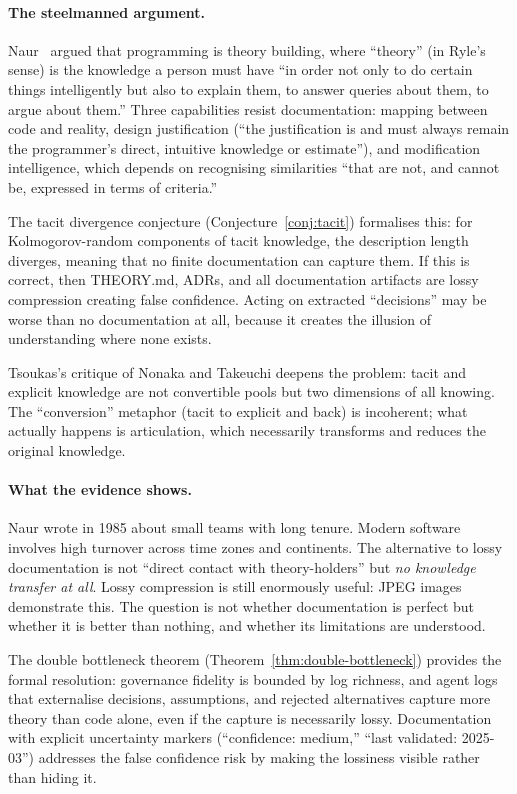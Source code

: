 \documentclass[11pt, a4paper]{googledeepmind}
\begin{document}
\paragraph{The steelmanned argument.}
Naur~\citep{naur1985} argued that programming is theory building, where ``theory'' (in Ryle's sense) is the knowledge a person must have ``in order not only to do certain things intelligently but also to explain them, to answer queries about them, to argue about them.'' Three capabilities resist documentation: mapping between code and reality, design justification (``the justification is and must always remain the programmer's direct, intuitive knowledge or estimate''), and modification intelligence, which depends on recognising similarities ``that are not, and cannot be, expressed in terms of criteria.''

The tacit divergence conjecture (Conjecture~\ref{conj:tacit}) formalises this: for Kolmogorov-random components of tacit knowledge, the description length diverges, meaning that no finite documentation can capture them. If this is correct, then THEORY.md, ADRs, and all documentation artifacts are lossy compression creating false confidence. Acting on extracted ``decisions'' may be worse than no documentation at all, because it creates the illusion of understanding where none exists.

Tsoukas's critique of Nonaka and Takeuchi deepens the problem: tacit and explicit knowledge are not convertible pools but two dimensions of all knowing. The ``conversion'' metaphor (tacit to explicit and back) is incoherent; what actually happens is articulation, which necessarily transforms and reduces the original knowledge.

\paragraph{What the evidence shows.}
Naur wrote in 1985 about small teams with long tenure. Modern software involves high turnover across time zones and continents. The alternative to lossy documentation is not ``direct contact with theory-holders'' but \emph{no knowledge transfer at all}. Lossy compression is still enormously useful: JPEG images demonstrate this. The question is not whether documentation is perfect but whether it is better than nothing, and whether its limitations are understood.

The double bottleneck theorem (Theorem~\ref{thm:double-bottleneck}) provides the formal resolution: governance fidelity is bounded by log richness, and agent logs that externalise decisions, assumptions, and rejected alternatives capture more theory than code alone, even if the capture is necessarily lossy. Documentation with explicit uncertainty markers (``confidence: medium,'' ``last validated: 2025-03'') addresses the false confidence risk by making the lossiness visible rather than hiding it.
\end{document}
